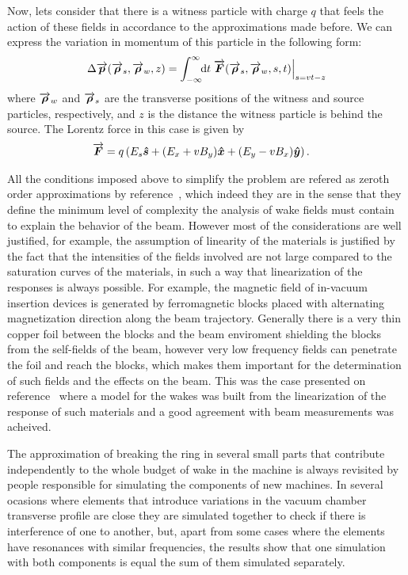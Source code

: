 \documentclass[
	12pt,				%
	openright,			%
	oneside,			%
	a4paper,		%
	chapter=TITLE,		%
	section=TITLE,		%
    brazil,				%
	english,			%
	sumario=tradicional,
	]{abntex2}
\begin{document}
  Now, lets consider that there is a witness particle with charge $q$ that feels the action of these fields in accordance to the approximations made before. We can express the variation in momentum of this particle in the following form:
  \begin{align}\label{eq:momentum_gain}
  	  \Delta \overrightarrow{\boldsymbol{p}}(\overrightarrow{\boldsymbol{\rho}}_s, \overrightarrow{\boldsymbol{\rho}}_w, z) = \int_{-\infty}^{\infty}\!\!\text{d}t \left.\overrightarrow{\boldsymbol{F}}(\overrightarrow{\boldsymbol{\rho}}_s, \overrightarrow{\boldsymbol{\rho}}_w, s, t)\right|_{s=vt-z}
  \end{align}
  where $\overrightarrow{\boldsymbol{\rho}}_w$ and $\overrightarrow{\boldsymbol{\rho}}_s$ are the transverse positions of the witness and source particles, respectively, and $z$ is the distance the witness particle is behind the source. The Lorentz force in this case is given by
  \begin{align}\label{eq:lorentz_force}
  	  \overrightarrow{\boldsymbol{F}} &= q\left(E_s\boldsymbol{\hat s} + (E_x+vB_y)\boldsymbol{\hat x} + (E_y-vB_x)\boldsymbol{\hat y}\right).
  \end{align}

  All the conditions imposed above to simplify the problem are refered as zeroth order approximations by reference~\cite{Stupakov2000a}, which indeed they are in the sense that they define the minimum level of complexity the analysis of wake fields must contain to explain the behavior of the beam. However most of the considerations are well justified, for example, the assumption of linearity of the materials is justified by the fact that the intensities of the fields involved are not large compared to the saturation curves of the materials, in such a way that linearization of the responses is always possible. For example, the magnetic field of in-vacuum insertion devices is generated by ferromagnetic blocks placed with alternating magnetization direction along the beam trajectory. Generally there is a very thin copper foil between the blocks and the beam enviroment shielding the blocks from the self-fields of the beam, however very low frequency fields can penetrate the foil and reach the blocks, which makes them important for the determination of such fields and the effects on the beam. This was the case presented on reference~\cite{Bassi} where a model for the wakes was built from the linearization of the response of such materials and a good agreement with beam measurements was acheived.

  The approximation of breaking the ring in several small parts that contribute independently to the whole budget of wake in the machine is always revisited by people responsible for simulating the components of new machines. In several ocasions where elements that introduce variations in the vacuum chamber transverse profile are close they are simulated together to check if there is interference of one to another, but, apart from some cases where the elements have resonances with similar frequencies, the results show that one simulation with both components is equal the sum of them simulated separately.
\end{document}
